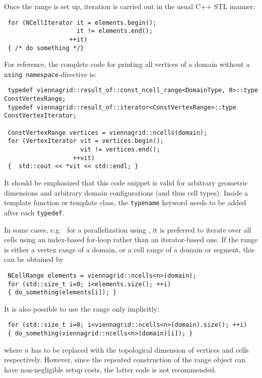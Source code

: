 Once the range is set up, iteration is carried out in the usual C++ STL manner:
\begin{lstlisting}
 for (NCellIterator it = elements.begin();
                    it != elements.end();
                  ++it)
 { /* do something */}
\end{lstlisting}
For reference, the complete code for printing all vertices of a domain without a \lstinline|using namespace|-directive is:
\begin{lstlisting}
 typedef viennagrid::result_of::const_ncell_range<DomainType, 0>::type   ConstVertexRange;
 typedef viennagrid::result_of::iterator<ConstVertexRange>::type         ConstVertexIterator;

 ConstVertexRange vertices = viennagrid::ncells(domain);
 for (VertexIterator vit = vertices.begin();
                     vit != vertices.end();
                   ++vit)
 {  std::cout << *vit << std::endl; }
\end{lstlisting}
It should be emphasized that this code snippet is valid for arbitrary geometric dimensions and arbitrary domain configurations (and thus cell types). Inside a template function or template class, the \lstinline|typename| keyword needs to be added after each \lstinline|typedef|.



In some cases, e.g.~ for a parallelization using \OpenMP \cite{openmp}, it is preferred to iterate over all cells using an index-based for-loop rather than an iterator-based one.
If the range is either a vertex range of a domain, or a cell range of a domain or segment, this can be obtained by
\begin{lstlisting}
 NCellRange elements = viennagrid::ncells<n>(domain);
 for (std::size_t i=0; i<elements.size(); ++i)
 { do_something(elements[i]); }
\end{lstlisting}
It is also possible to use the range only implicitly:
\begin{lstlisting}
 for (std::size_t i=0; i<viennagrid::ncells<n>(domain).size(); ++i)
 { do_something(viennagrid::ncells<n>(domain)[i]); }
\end{lstlisting}
where $n$ has to be replaced with the topological dimension of vertices and cells respectively. However, since the repeated construction of the range object can have non-negligible setup costs, the latter code is not recommended.



